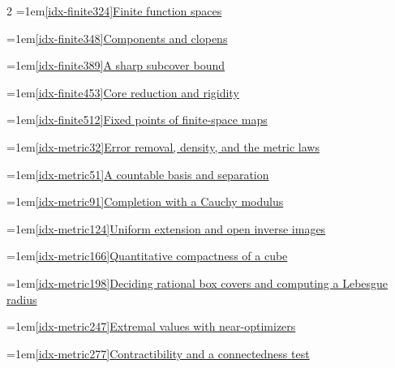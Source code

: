 \begin{multicols}{2}
\noindent\hangindent=1em\hyperref[idx-finite324]{\ref*{idx-finite324}\enspace Finite function spaces}\nobreak\dotfill\,\pageref{idx-finite324}\par
\noindent\hangindent=1em\hyperref[idx-finite348]{\ref*{idx-finite348}\enspace Components and clopens}\nobreak\dotfill\,\pageref{idx-finite348}\par
\noindent\hangindent=1em\hyperref[idx-finite389]{\ref*{idx-finite389}\enspace A sharp subcover bound}\nobreak\dotfill\,\pageref{idx-finite389}\par
\noindent\hangindent=1em\hyperref[idx-finite453]{\ref*{idx-finite453}\enspace Core reduction and rigidity}\nobreak\dotfill\,\pageref{idx-finite453}\par
\noindent\hangindent=1em\hyperref[idx-finite512]{\ref*{idx-finite512}\enspace Fixed points of finite-space maps}\nobreak\dotfill\,\pageref{idx-finite512}\par
\par\addvspace{6pt}\par\nobreak
\noindent\hangindent=1em\hyperref[idx-metric32]{\ref*{idx-metric32}\enspace Error removal, density, and the metric laws}\nobreak\dotfill\,\pageref{idx-metric32}\par
\noindent\hangindent=1em\hyperref[idx-metric51]{\ref*{idx-metric51}\enspace A countable basis and separation}\nobreak\dotfill\,\pageref{idx-metric51}\par
\noindent\hangindent=1em\hyperref[idx-metric91]{\ref*{idx-metric91}\enspace Completion with a Cauchy modulus}\nobreak\dotfill\,\pageref{idx-metric91}\par
\noindent\hangindent=1em\hyperref[idx-metric124]{\ref*{idx-metric124}\enspace Uniform extension and open inverse images}\nobreak\dotfill\,\pageref{idx-metric124}\par
\noindent\hangindent=1em\hyperref[idx-metric166]{\ref*{idx-metric166}\enspace Quantitative compactness of a cube}\nobreak\dotfill\,\pageref{idx-metric166}\par
\noindent\hangindent=1em\hyperref[idx-metric198]{\ref*{idx-metric198}\enspace Deciding rational box covers and computing a Lebesgue radius}\nobreak\dotfill\,\pageref{idx-metric198}\par
\noindent\hangindent=1em\hyperref[idx-metric247]{\ref*{idx-metric247}\enspace Extremal values with near-optimizers}\nobreak\dotfill\,\pageref{idx-metric247}\par
\noindent\hangindent=1em\hyperref[idx-metric277]{\ref*{idx-metric277}\enspace Contractibility and a connectedness test}\nobreak\dotfill\,\pageref{idx-metric277}\par

\end{multicols}
